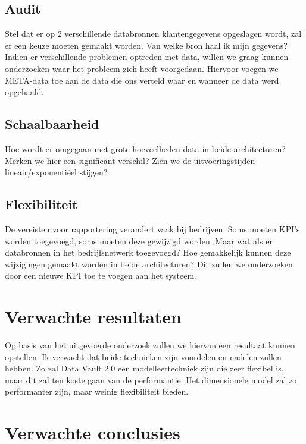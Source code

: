 \subsection{Audit}
Stel dat er op 2 verschillende databronnen klantengegevens opgeslagen wordt, zal er een keuze moeten gemaakt worden. Van welke bron haal ik mijn gegevens? Indien er verschillende problemen optreden met data, willen we graag kunnen onderzoeken waar het probleem zich heeft voorgedaan. Hiervoor voegen we META-data toe aan de data die ons verteld waar en wanneer de data werd opgehaald. 

\subsection{Schaalbaarheid}
Hoe wordt er omgegaan met grote hoeveelheden data in beide architecturen? Merken we hier een significant verschil? Zien we de uitvoeringstijden lineair/exponentiëel stijgen? 

\subsection{Flexibiliteit}
De vereisten voor rapportering verandert vaak bij bedrijven. Soms moeten KPI's worden toegevoegd, soms moeten deze gewijzigd worden. Maar wat als er databronnen in het bedrijfsnetwerk toegevoegd? Hoe gemakkelijk kunnen deze wijzigingen gemaakt worden in beide architecturen? Dit zullen we onderzoeken door een nieuwe KPI toe te voegen aan het systeem. 
 


\section{Verwachte resultaten}
\label{sec:verwachte_resultaten}

Op basis van het uitgevoerde onderzoek zullen we hiervan een resultaat kunnen opstellen. Ik verwacht dat beide technieken zijn voordelen en nadelen zullen hebben. Zo zal Data Vault 2.0 een modelleertechniek zijn die zeer flexibel is, maar dit zal ten koste gaan van de performantie. Het dimensionele model zal zo performanter zijn, maar weinig flexibiliteit bieden.

\section{Verwachte conclusies}
\label{sec:verwachte_conclusies}

